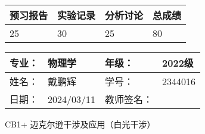 \documentclass[dvipsnames, svgnames,a4paper,11pt]{article}
\begin{document}
\begin{table}
	\renewcommand\arraystretch{1.7}
	\begin{tabularx}{\textwidth}{
		|X|X|X|X
		|X|X|X|X|}
	\hline
	\multicolumn{2}{|c|}{预习报告}&\multicolumn{2}{|c|}{实验记录}&\multicolumn{2}{|c|}{分析讨论}&\multicolumn{2}{|c|}{总成绩}\\
	\hline
	\LARGE25 & & \LARGE30 & & \LARGE25 & & \LARGE80 & \\
	\hline
	\end{tabularx}
\end{table}


\begin{table}
	\renewcommand\arraystretch{1.7}
	\begin{tabularx}{\textwidth}{|X|X|X|X|}
	\hline
	专业：& 物理学 &年级：& 2022级\\
	\hline
	姓名：& 戴鹏辉  & 学号： & 2344016 \\
	\hline
	日期：& 2024/03/11 & 教师签名：& \\
	\hline
	\end{tabularx}
\end{table}

\begin{center}
	\LARGE CB1+ \quad 迈克尔逊干涉及应用（白光干涉） 
\end{center}
\end{document}
